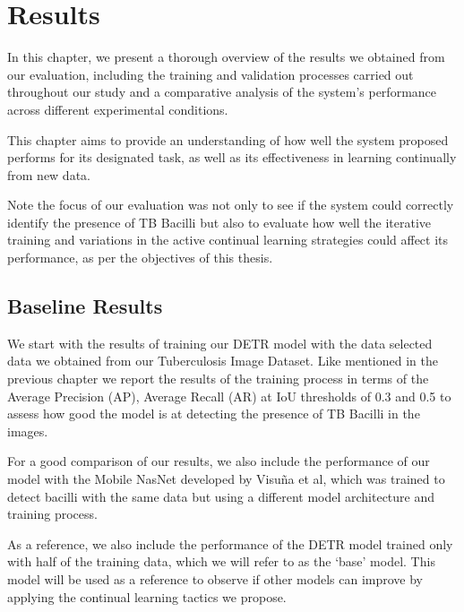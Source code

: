 \documentclass[../main.tex]{subfiles}
\begin{document}
\chapter{Results} \label{chap:results}


\vspace{-0.5cm}
In this chapter, we present a thorough overview of the results we obtained from our evaluation, including the training and validation processes carried out throughout our study and a comparative analysis of the system's performance across different experimental conditions. 

This chapter aims to provide an understanding of how well the system proposed performs for its designated task, as well as its effectiveness in learning continually from new data. 

Note the focus of our evaluation was not only to see if the system could correctly identify the presence of TB Bacilli but also to evaluate how well the iterative training and variations in the active continual learning strategies could affect its performance, as per the objectives of this thesis.

\section{Baseline Results} \label{results:baseline}

We start with the results of training our DETR model with the data selected data we obtained from our Tuberculosis Image Dataset. Like mentioned in the previous chapter we report the results of the training process in terms of the Average Precision (AP), Average Recall (AR) at IoU thresholds of 0.3 and 0.5 to assess how good the model is at detecting the presence of TB Bacilli in the images.

For a good comparison of our results, we also include the performance of our model with the Mobile NasNet developed by Visuña et al, which was trained to detect bacilli with the same data but using a different model architecture and training process. 

As a reference, we also include the performance of the DETR model trained only with half of the training data, which we will refer to as the `base' model. This model will be used as a reference to observe if other models can improve by applying the continual learning tactics we propose.
\end{document}
